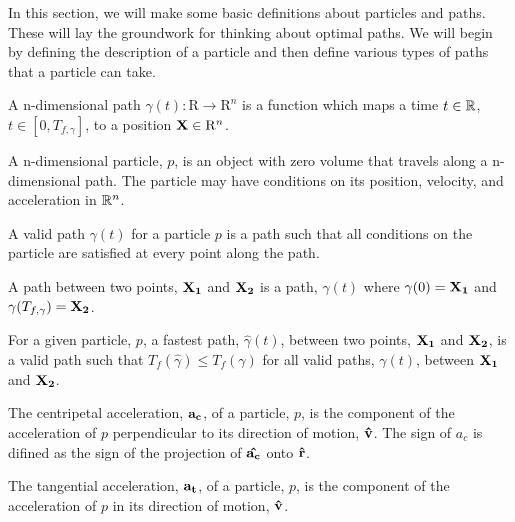 In this section, we will make some basic definitions about particles and paths. These will lay the groundwork for thinking about optimal paths. We will begin by defining the description of a particle and then define various types of paths that a particle can take.

\begin{definition}
A n-dimensional path $\gamma(t): \mathrm{R} \to \mathrm{R}^n$ is a function which maps a time $t \in \mathbb R$, $t \in [0, T_{f, \gamma}]$, to a position $\mathbf{X} \in \mathrm{R}^n$. 
\end{definition}

\begin{definition}
  A n-dimensional particle, $p$, is an object with zero volume that travels along a n-dimensional path. The particle may have conditions on its position, velocity, and acceleration in $\mathbb R^n$.
\end{definition}

\begin{definition}
  A valid path $\gamma(t)$ for a particle $p$ is a path such that all conditions on the particle are satisfied at every point along the path.
\end{definition}

\begin{definition}
  A path between two points, $\mathbf{X_1}$ and $\mathbf{X_2}$ is a path, $\gamma(t)$ where $\gamma(0) = \mathbf{X_1}$ and $\gamma(T_{f, \gamma}) = \mathbf{X_2}$.
\end{definition}

\begin{definition}
  For a given particle, $p$, a fastest path, $\hat{\gamma}(t)$, between two points, $\mathbf{X_1}$ and $\mathbf{X_2}$, is a valid path such that $T_f(\hat{\gamma}) \leq T_f(\gamma)$ for all valid paths, $\gamma(t)$, between $\mathbf{X_1}$ and $\mathbf{X_2}$.
\end{definition}

\begin{definition}
  The centripetal acceleration, $\mathbf{a_c}$, of a particle, $p$, is the component of the acceleration of $p$ perpendicular to its direction of motion, $\mathbf{\hat{v}}$. The sign of $a_c$ is difined as the sign of the projection of $\mathbf{\hat{a_c}}$ onto $\mathbf{\hat{r}}$.
\end{definition}

\begin{definition}
  The tangential acceleration, $\mathbf{a_t}$, of a particle, $p$, is the component of the acceleration of $p$ in its direction of motion, $\mathbf{\hat{v}}$.
\end{definition}


